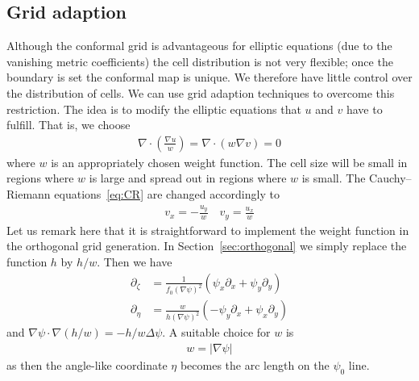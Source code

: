 \subsection{Grid adaption} \label{sec:adaption}
Although the conformal grid is advantageous for elliptic equations (due to the vanishing metric
coefficients) the cell distribution is not very flexible; once the boundary is set
the conformal map is unique. We therefore have little control over the 
distribution of cells. 
We can use grid adaption techniques to overcome this restriction. 
The idea is to modify the elliptic equations that $u$ and $v$ have 
to fulfill. That is, we choose 
\begin{align}
\nabla\cdot\left( \frac{\nabla u}{w}\right) = \nabla\cdot\left( w \nabla v\right) = 0
\label{eq:adaption}
\end{align}
where $w$ is an appropriately chosen weight function. The 
cell size will be small in regions where $w$ is large and spread out in regions
where $w$ is small.
The Cauchy--Riemann equations~\eqref{eq:CR} are changed accordingly to 
\begin{align}
v_x = -\frac{u_y}{w}\quad v_y = \frac{u_x}{w}
\label{eq:CR_adaption}
\end{align}
Let us remark here that it is straightforward to implement the weight function in the orthogonal grid generation. 
In Section~\ref{sec:orthogonal} we simply replace the function $h$ by $h/w$.
Then we have
\begin{subequations}
\begin{align}
\partial_\zeta &= \frac{1}{f_0(\nabla\psi)^2} (\psi_x\partial_x + \psi_y \partial_y)\\
\partial_\eta &= \frac{w}{h(\nabla\psi)^2} (-\psi_y\partial_x + \psi_x \partial_y)
\end{align}
\end{subequations}
and $\nabla \psi\cdot \nabla (h/w) = -h/w \Delta\psi$.
A suitable choice for $w$ is 
\begin{align}
w = |\nabla\psi|
\label{eq:weight_adaption}
\end{align}
as then the angle-like coordinate $\eta$ becomes the arc length on the $\psi_0$ line. 

